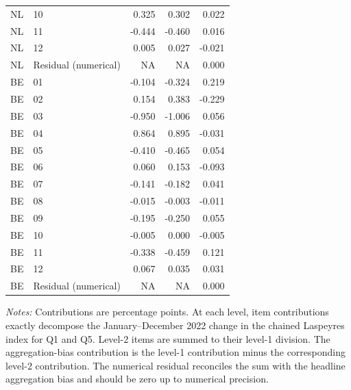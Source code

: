 \begin{longtable}[t]{llrrr}
NL & 10 & 0.325 & 0.302 & 0.022\\
NL & 11 & -0.444 & -0.460 & 0.016\\
NL & 12 & 0.005 & 0.027 & -0.021\\
NL & Residual (numerical) & NA & NA & 0.000\\
\addlinespace
BE & 01 & -0.104 & -0.324 & 0.219\\
BE & 02 & 0.154 & 0.383 & -0.229\\
BE & 03 & -0.950 & -1.006 & 0.056\\
BE & 04 & 0.864 & 0.895 & -0.031\\
BE & 05 & -0.410 & -0.465 & 0.054\\
\addlinespace
BE & 06 & 0.060 & 0.153 & -0.093\\
BE & 07 & -0.141 & -0.182 & 0.041\\
BE & 08 & -0.015 & -0.003 & -0.011\\
BE & 09 & -0.195 & -0.250 & 0.055\\
BE & 10 & -0.005 & 0.000 & -0.005\\
\addlinespace
BE & 11 & -0.338 & -0.459 & 0.121\\
BE & 12 & 0.067 & 0.035 & 0.031\\
BE & Residual (numerical) & NA & NA & 0.000\\
\bottomrule
\end{longtable}
\begin{flushleft}
\footnotesize{\emph{Notes:} Contributions are percentage points. At each level, item contributions exactly decompose the January--December 2022 change in the chained Laspeyres index for Q1 and Q5. Level-2 items are summed to their level-1 division. The aggregation-bias contribution is the level-1 contribution minus the corresponding level-2 contribution. The numerical residual reconciles the sum with the headline aggregation bias and should be zero up to numerical precision.}
\end{flushleft}

